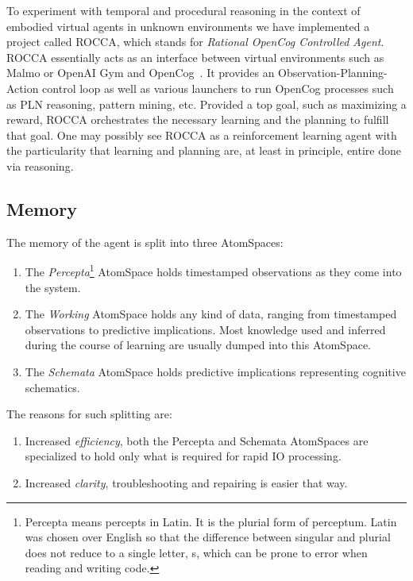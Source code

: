 \documentclass[runningheads]{llncs}
\begin{document}
To experiment with temporal and procedural reasoning in the context of
embodied virtual agents in unknown environments we have implemented a
project called ROCCA, which stands for \emph{Rational OpenCog
  Controlled Agent}.  ROCCA essentially acts as an interface between
virtual environments such as Malmo \cite{Johnson2016} or OpenAI Gym
\cite{Brockman2016} and OpenCog~\cite{Hart2008}.  It provides an
Observation-Planning-Action control loop as well as various launchers
to run OpenCog processes such as PLN reasoning, pattern mining, etc.
Provided a top goal, such as maximizing a reward, ROCCA orchestrates
the necessary learning and the planning to fulfill that goal.
One may possibly see ROCCA as a reinforcement learning agent with the
particularity that learning and planning are, at least in principle,
entire done via reasoning.

\subsection{Memory}

The memory of the agent is split into three AtomSpaces:
\begin{enumerate}
\item The \emph{Percepta}\footnote{Percepta means percepts in Latin.
    It is the plurial form of perceptum.  Latin was chosen over
    English so that the difference between singular and plurial does
    not reduce to a single letter, s, which can be prone to error when
    reading and writing code.}  AtomSpace holds timestamped
  observations as they come into the system.
\item The \emph{Working} AtomSpace holds any kind of data, ranging
  from timestamped observations to predictive implications.  Most
  knowledge used and inferred during the course of learning are
  usually dumped into this AtomSpace.
\item The \emph{Schemata} AtomSpace holds predictive implications
  representing cognitive schematics.
\end{enumerate}
The reasons for such splitting are:
\begin{enumerate}
\item Increased \emph{efficiency}, both the Percepta and Schemata
  AtomSpaces are specialized to hold only what is required for rapid
  IO processing.
\item Increased \emph{clarity}, troubleshooting and repairing is
  easier that way.
\end{enumerate}
\end{document}
